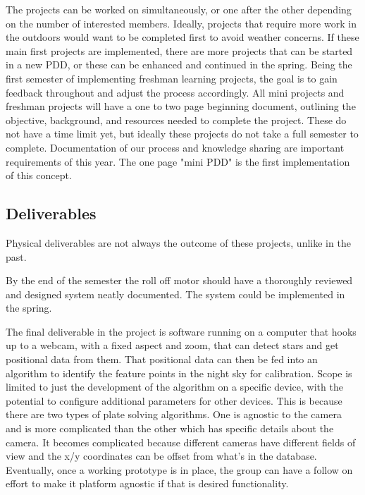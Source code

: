 \documentclass[conference]{IEEEtran} %
\begin{document}
The projects can be worked on simultaneously, or one after the other depending on the number of interested members. Ideally, projects that require more work in the outdoors would want to be completed first to avoid weather concerns. If these main first projects are implemented, there are more projects that can be started in a new PDD, or these can be enhanced and continued in the spring. Being the first semester of implementing freshman learning projects, the goal is to gain feedback throughout and adjust the process accordingly. All mini projects and freshman projects will have a one to two page beginning document, outlining the objective, background, and resources needed to complete the project. These do not have a time limit yet, but ideally these projects do not take a full semester to complete. Documentation of our process and knowledge sharing are important requirements of this year. The one page "mini PDD" is the first implementation of this concept.



\subsection{Deliverables}
\label{subsec:deliverables}
Physical deliverables are not always the outcome of these projects, unlike in the past. 

By the end of the semester the roll off motor should have a thoroughly reviewed and designed system neatly documented. The system could be implemented in the spring. 

The final deliverable in the project is software running on a computer that hooks up to a webcam, with a fixed aspect and zoom, that can detect stars and get positional data from them.  That positional data can then be fed into an algorithm to identify the feature points in the night sky for calibration.  Scope is limited to just the development of the algorithm on a specific device, with the potential to configure additional parameters for other devices.  This is because there are two types of plate solving algorithms.  One is agnostic to the camera and is more complicated than the other which has specific details about the camera.  It becomes complicated because different cameras have different fields of view and the x/y coordinates can be offset from what's in the database.  Eventually, once a working prototype is in place, the group can have a follow on effort to make it platform agnostic if that is desired functionality.
\end{document}
